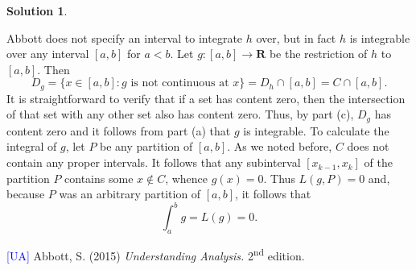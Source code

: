 \documentclass[12pt]{article}
\theoremstyle{definition}
\theoremstyle{exercise}
\theoremstyle{solution}
\newtheorem*{solution}{Solution}
\newcommand{\ts}{\textsuperscript}
\newcommand{\R}{\mathbf{R}}
\begin{document}
\begin{solution}
\begin{enumerate}
        Abbott does not specify an interval to integrate \( h \) over, but in fact \( h \) is integrable over any interval \( [a, b] \) for \( a < b \). Let \( g : [a, b] \to \R \) be the restriction of \( h \) to \( [a, b] \). Then
        \[
            D_g = \{ x \in [a, b] : g \text{ is not continuous at } x \} = D_h \cap [a, b] = C \cap [a, b].
        \]
        It is straightforward to verify that if a set has content zero, then the intersection of that set with any other set also has content zero. Thus, by part (c), \( D_g \) has content zero and it follows from part (a) that \( g \) is integrable. To calculate the integral of \( g \), let \( P \) be any partition of \( [a, b] \). As we noted before, \( C \) does not contain any proper intervals. It follows that any subinterval \( [x_{k-1}, x_k] \) of the partition \( P \) contains some \( x \not\in C \), whence \( g(x) = 0 \). Thus \( L(g, P) = 0 \) and, because \( P \) was an arbitrary partition of \( [a, b] \), it follows that
        \[
            \int_a^b g = L(g) = 0.
        \]
    \end{enumerate}
\end{solution}

\noindent \hrulefill

\noindent \hypertarget{ua}{\textcolor{blue}{[UA]} Abbott, S. (2015) \textit{Understanding Analysis.} 2\ts{nd} edition.}
\end{document}
